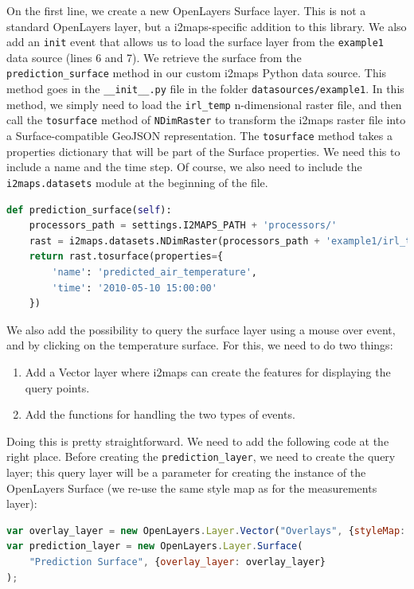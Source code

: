 \documentclass[11pt]{article}
\begin{document}
On the first line, we create a new OpenLayers Surface layer. This is not a standard OpenLayers layer, but a i2maps-specific addition to this library. We also add an \texttt{init} event that allows us to load the surface layer from the \texttt{example1} data source (lines 6 and 7). We retrieve the surface from the \texttt{prediction\_surface} method in our custom i2maps Python data source. This method goes in the \verb=__init__.py= file in the folder \texttt{datasources/example1}. In this method, we simply need to load the \texttt{irl\_temp} n-dimensional raster file, and then call the \texttt{tosurface} method of \texttt{NDimRaster} to transform the i2maps raster file into a Surface-compatible GeoJSON representation. The \texttt{tosurface} method takes a properties dictionary that will be part of the Surface properties. We need this to include a name and the time step. Of course, we also need to include the \texttt{i2maps.datasets} module at the beginning of the file.

\begin{lstlisting}[language=Python]
def prediction_surface(self):
    processors_path = settings.I2MAPS_PATH + 'processors/'
    rast = i2maps.datasets.NDimRaster(processors_path + 'example1/irl_temp')
    return rast.tosurface(properties={
        'name': 'predicted_air_temperature', 
        'time': '2010-05-10 15:00:00'
    })
\end{lstlisting}





We also add the possibility to query the surface layer using a mouse over event, and by clicking on the temperature surface. For this, we need to do two things:
\begin{enumerate}
	\item Add a Vector layer where i2maps can create the features for displaying the query points.
	\item Add the  functions for handling the two types of events.
\end{enumerate}
Doing this is pretty straightforward. We need to add the following code at the right place. Before creating the \texttt{prediction\_layer}, we need to create the query layer; this query layer will be a parameter for creating the instance of the OpenLayers Surface (we re-use the same style map as for the measurements layer):

\begin{lstlisting}[language=JavaScript]
var overlay_layer = new OpenLayers.Layer.Vector("Overlays", {styleMap: styleMap});
var prediction_layer = new OpenLayers.Layer.Surface(
    "Prediction Surface", {overlay_layer: overlay_layer}
);
\end{lstlisting}
\end{document}
